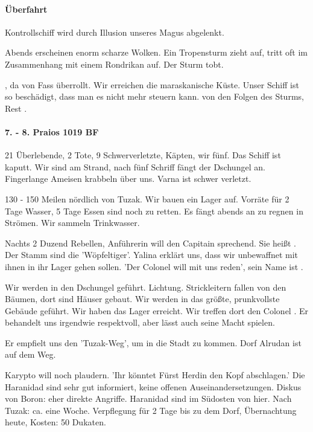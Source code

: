\paragraph{Überfahrt}
\label{sec:uberfahrt}

Kontrollschiff wird durch Illusion unseres Magus abgelenkt.

Abends erscheinen enorm scharze Wolken. Ein Tropensturm zieht auf, tritt oft im Zusammenhang mit einem Rondrikan auf. Der Sturm tobt.

, da von Fass überrollt. Wir erreichen die maraskanische Küste. Unser Schiff ist so beschädigt, dass man es nicht mehr steuern kann.  von den Folgen des Sturms, Rest .

\paragraph{7. - 8. Praios 1019 BF}
\label{sec:7.-praios-1019}
21 Überlebende, 2 Tote, 9 Schwerverletzte, Käpten, wir fünf. Das Schiff ist kaputt. Wir sind am Strand, nach fünf Schriff fängt der Dschungel an. Fingerlange Ameisen krabbeln über uns. Varna ist schwer verletzt.

130 - 150 Meilen nördlich von Tuzak. Wir bauen ein Lager auf. Vorräte für 2 Tage Wasser, 5 Tage Essen sind noch zu retten. Es fängt abends an zu regnen in Strömen. Wir sammeln Trinkwasser.

Nachts 2 Duzend Rebellen, Anführerin will den Capitain sprechend. Sie heißt . Der Stamm sind die 'Wöpfeltiger'. Yalina erklärt uns, dass wir unbewaffnet mit ihnen in ihr Lager gehen sollen. 'Der Colonel will mit uns reden', sein Name ist .

Wir werden in den Dschungel geführt. Lichtung. Strickleitern fallen von den Bäumen, dort sind Häuser gebaut. Wir werden in das größte, prunkvollste Gebäude geführt. Wir haben das Lager erreicht. Wir treffen dort den Colonel . Er behandelt uns irgendwie respektvoll, aber lässt auch seine Macht spielen.

Er empfielt uns den 'Tuzak-Weg', um in die Stadt zu kommen. Dorf Alrudan ist auf dem Weg.

Karypto will noch plaudern. 'Ihr könntet Fürst Herdin den Kopf abschlagen.' Die Haranidad sind sehr gut informiert, keine offenen Auseinandersetzungen. Diskus von Boron: eher direkte Angriffe.
Haranidad sind im Südosten von hier. Nach Tuzak: ca. eine Woche. Verpflegung für 2 Tage bis zu dem Dorf, Übernachtung heute, Kosten: 50 Dukaten. 


